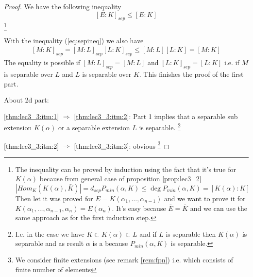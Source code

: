 \begin{theorem}
\begin{proof}
    We have the following inequality
    \begin{equation}
      \left[E:K\right]_{sep} \le \left[E:K\right]
      \label{eq:sepineq}
    \end{equation}
    \footnote{
      The inequality can be proved by induction using the fact that
      it's true for $K\left(\alpha\right)$ because from general case
      of proposition \ref{prop:lec3_2} 
      \[
      \left|Hom_K\left(K\left(\alpha\right), \bar{K}\right)\right| =
      d_{sep} P_{min}\left(\alpha, K\right) \le
      \deg P_{min}\left(\alpha, K\right) =
      \left[K\left(\alpha\right): K \right]
      \]
      Then let it was proved for $E = K\left(\alpha_1, \dots,
      \alpha_{n-1}\right)$ and we want to prove it for
      $K\left(\alpha_1, \dots,
      \alpha_{n-1}, \alpha_n\right) = E\left(\alpha_n\right)$.
      It's easy because $\bar{E} = \bar{K}$  and we can use the same
      approach as for the first induction step.
    }

    With the inequality (\ref{eq:sepineq}) we also have
    \begin{eqnarray}
    \left[M:K\right]_{sep} = 
    \left[M:L\right]_{sep} \left[L:K\right]_{sep} \le
    \left[M:L\right] \left[L:K\right] = \left[M:K\right]
    \nonumber
    \end{eqnarray}
    The equality is possible if
    $\left[M:L\right]_{sep} = \left[M:L\right]$ and 
    $\left[L:K\right]_{sep} = \left[L:K\right]$ i.e. if
    $M$ is separable over $L$ and $L$ is
    separable over $K$.
    This finishes the proof of the first part.
    
    About 2d part:

    \ref{thm:lec3_3:itm:1} $\Rightarrow$ \ref{thm:lec3_3:itm:2}:
    Part 1 implies that a separable sub extension
    $K\left(\alpha\right)$ or a separable extension $L$ is separable.
    \footnote{
      I.e. in the case we have $K \subset K\left(\alpha\right) \subset
      L$ and if $L$ is separable then $K\left(\alpha\right)$ is
      separable and as result $\alpha$ is a
       because $P_{min}\left(\alpha, K\right)$
      is separable.
    }
    
    \ref{thm:lec3_3:itm:2} $\Rightarrow$ \ref{thm:lec3_3:itm:3}:
    obvious
    \footnote{
      We consider finite extensions (see remark \ref{rem:fpn})
      i.e. which consists of finite number of elements
    }


\end{proof}
\end{theorem}
